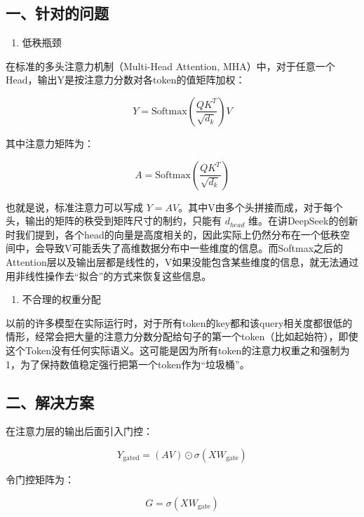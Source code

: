 \hypertarget{ux4e00ux9488ux5bf9ux7684ux95eeux9898}{%
\subsection{一、针对的问题}\label{ux4e00ux9488ux5bf9ux7684ux95eeux9898}}

\begin{enumerate}
\def\labelenumi{\arabic{enumi}.}
\tightlist
\item
  低秩瓶颈
\end{enumerate}

在标准的多头注意力机制（Multi-Head Attention, MHA）中，对于任意一个Head，输出Y是按注意力分数对各token的值矩阵加权：

\[
Y=\mathrm{Softmax}\left(\frac{QK^T}{\sqrt{d_k}}\right)V
\]

其中注意力矩阵为：

\[
A=\mathrm{Softmax}\left(\frac{QK^T}{\sqrt{d_k}}\right)
\]

也就是说，标准注意力可以写成 \(Y=AV\)。其中V由多个头拼接而成，对于每个头，输出的矩阵的秩受到矩阵尺寸的制约，只能有 \(d_{head}\) 维。在讲DeepSeek的创新时我们提到，各个head的向量是高度相关的，因此实际上仍然分布在一个低秩空间中，会导致V可能丢失了高维数据分布中一些维度的信息。而Softmax之后的Attention层以及输出层都是线性的，V如果没能包含某些维度的信息，就无法通过用非线性操作去``拟合''的方式来恢复这些信息。

\begin{enumerate}
\def\labelenumi{\arabic{enumi}.}
\setcounter{enumi}{1}
\tightlist
\item
  不合理的权重分配
\end{enumerate}

以前的许多模型在实际运行时，对于所有token的key都和该query相关度都很低的情形，经常会把大量的注意力分数分配给句子的第一个token（比如起始符），即使这个Token没有任何实际语义。这可能是因为所有token的注意力权重之和强制为1，为了保持数值稳定强行把第一个token作为``垃圾桶''。

\hypertarget{ux4e8cux89e3ux51b3ux65b9ux6848-1}{%
\subsection{二、解决方案}\label{ux4e8cux89e3ux51b3ux65b9ux6848-1}}

在注意力层的输出后面引入门控：

\[
Y_{\mathrm{gated}}=(AV)\odot\sigma(XW_{\mathrm{gate}})
\]

令门控矩阵为：

\[
G=\sigma(XW_{\mathrm{gate}})
\]

